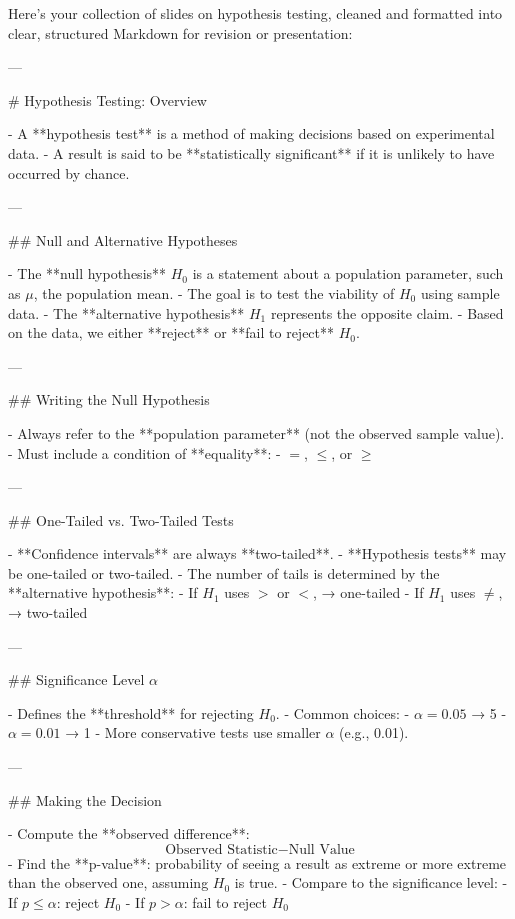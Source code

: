 
Here’s your collection of slides on hypothesis testing, cleaned and formatted into clear, structured Markdown for revision or presentation:

---

# Hypothesis Testing: Overview

- A **hypothesis test** is a method of making decisions based on experimental data.
- A result is said to be **statistically significant** if it is unlikely to have occurred by chance.

---

## Null and Alternative Hypotheses

- The **null hypothesis** \( H_0 \) is a statement about a population parameter, such as \( \mu \), the population mean.
- The goal is to test the viability of \( H_0 \) using sample data.
- The **alternative hypothesis** \( H_1 \) represents the opposite claim.
- Based on the data, we either **reject** or **fail to reject** \( H_0 \).

---

## Writing the Null Hypothesis

- Always refer to the **population parameter** (not the observed sample value).
- Must include a condition of **equality**:
  - \( = \), \( \leq \), or \( \geq \)

---

## One-Tailed vs. Two-Tailed Tests

- **Confidence intervals** are always **two-tailed**.
- **Hypothesis tests** may be one-tailed or two-tailed.
- The number of tails is determined by the **alternative hypothesis**:
  - If \( H_1 \) uses \( > \) or \( < \), → one-tailed
  - If \( H_1 \) uses \( \neq \), → two-tailed

---

## Significance Level \( \alpha \)

- Defines the **threshold** for rejecting \( H_0 \).
- Common choices:
  - \( \alpha = 0.05 \) → 5%
  - \( \alpha = 0.01 \) → 1%
- More conservative tests use smaller \( \alpha \) (e.g., 0.01).

---

## Making the Decision

- Compute the **observed difference**:  
  \[
  \text{Observed Statistic} - \text{Null Value}
  \]
- Find the **p-value**: probability of seeing a result as extreme or more extreme than the observed one, assuming \( H_0 \) is true.
- Compare to the significance level:
  - If \( p \leq \alpha \): reject \( H_0 \)
  - If \( p > \alpha \): fail to reject \( H_0 \)

